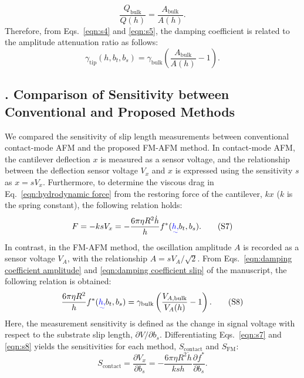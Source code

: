 \documentclass[journal=jacsat,manuscript=article]{achemso}
\newcounter{supppart}
\renewcommand{\thesupppart}{\Roman{supppart}}
\newcommand{\subsectionpart}[2]{%
  \refstepcounter{supppart}%
  \subsection{\thesupppart. #2}%
  \label{supppart:#1}%
}
\providecommand{\DIFadd}[1]{{\protect\color{blue}\uwave{#1}}} %
\providecommand{\DIFaddbegin}{} %
\providecommand{\DIFaddend}{} %
\newcommand{\DIFaddincludegraphics}[2][]{{\color{blue}\fbox{\DIFOincludegraphics[#1]{#2}}}} %
\DeclareRobustCommand{\DIFaddbegin}{\DIFOaddbegin \let\includegraphics\DIFaddincludegraphics} %
\DeclareRobustCommand{\DIFaddend}{\DIFOaddend \let\includegraphics\DIFOincludegraphics} %
\begin{document}
\begin{equation}
  \frac{Q_{\text{bulk}}}{Q(h)} = \frac{A_{\text{bulk}}}{A(h)}.
  \tag{S5}
  \label{eqn:s5}
\end{equation}
Therefore, from Eqs.~\ref{eqn:s4} and \ref{eqn:s5}, the damping coefficient is related to the amplitude attenuation ratio as follows:
\begin{equation}
  \gamma_{\text{tip}}(h, b_t, b_s) = \gamma_{\text{bulk}}\left(\frac{A_{\text{bulk}}}{A(h)} - 1\right).
  \tag{S6}
  \label{eqn:s6}
\end{equation}
\subsectionpart{sensitivity-comparison}{Comparison of Sensitivity between Conventional and Proposed Methods}

We compared the sensitivity of slip length measurements between conventional contact-mode AFM and the proposed FM-AFM method. In contact-mode AFM, the cantilever deflection \(x\) is measured as a sensor voltage, and the relationship between the deflection sensor voltage \(V_x\) and \(x\) is expressed using the sensitivity \(s\) as \(x = sV_x\). Furthermore, to determine the viscous drag in Eq.~\ref{eqn:hydrodynamic force} from the restoring force of the cantilever, \(kx\) (\(k\) is the spring constant), the following relation holds:
\begin{equation}
  F = -ksV_x = -\frac{6\pi\eta R^2 \dot{h}}{h} f^{*}(\DIFaddbegin \DIFadd{h, }\DIFaddend b_t, b_s).
  \tag{S7}
  \label{eqn:s7}
\end{equation}
In contrast, in the FM-AFM method, the oscillation amplitude \(A\) is recorded as a sensor voltage \(V_A\), with the relationship \(A = sV_A/\sqrt{2}\). From Eqs.~\ref{eqn:damping coefficient amplitude} and \ref{eqn:damping coefficient slip} of the manuscript, the following relation is obtained:
\begin{equation}
  \frac{6\pi\eta R^2}{h} f^{*}(\DIFaddbegin \DIFadd{h, }\DIFaddend b_t, b_s) = \gamma_{\text{bulk}}\left(\frac{V_{A,\text{bulk}}}{V_A(h)} - 1\right).
  \tag{S8}
  \label{eqn:s8}
\end{equation}
Here, the measurement sensitivity is defined as the change in signal voltage with respect to the substrate slip length, \(\partial V/\partial b_s\). Differentiating Eqs.~\ref{eqn:s7} and \ref{eqn:s8} yields the sensitivities for each method, \(S_{\text{contact}}\) and \(S_{\text{FM}}\):
\begin{equation}
  S_{\text{contact}} = \frac{\partial V_x}{\partial b_s} = -\frac{6\pi\eta R^2 \dot{h}}{k s h}\frac{\partial f^{*}}{\partial b_s}.
  \tag{S9}
  \label{eqn:s9}
\end{equation}
\end{document}
